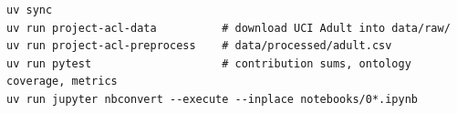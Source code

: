 \documentclass[11pt,a4paper]{article}
\begin{document}
\begin{lstlisting}
uv sync
uv run project-acl-data          # download UCI Adult into data/raw/
uv run project-acl-preprocess    # data/processed/adult.csv
uv run pytest                    # contribution sums, ontology coverage, metrics
uv run jupyter nbconvert --execute --inplace notebooks/0*.ipynb
\end{lstlisting}

\printbibliography
\end{document}
